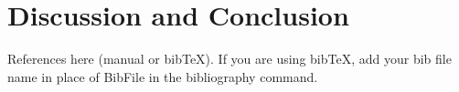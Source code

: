 \documentclass[]{AEA}
\begin{document}
\section{Discussion and Conclusion}



References here (manual or bibTeX). If you are using bibTeX, add your bib file 
name in place of BibFile in the bibliography command.



\appendix
\end{document}
